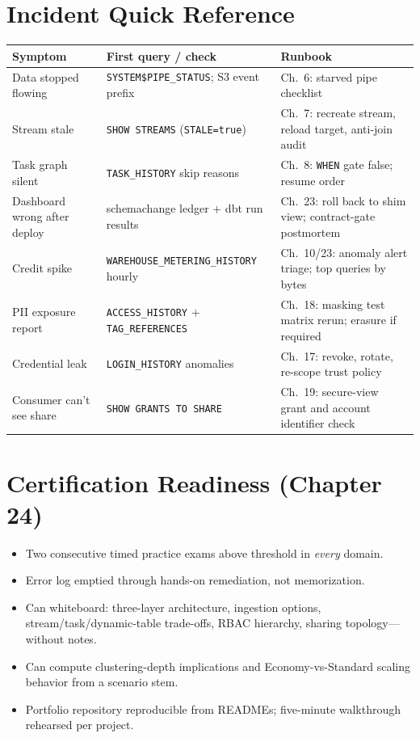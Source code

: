 \section{Incident Quick Reference}
\begin{center}
\footnotesize
\begin{tabular}{@{}p{4.4cm}p{4.8cm}p{4.8cm}@{}}
\toprule
\textbf{Symptom} & \textbf{First query / check} & \textbf{Runbook} \\
\midrule
Data stopped flowing & \texttt{SYSTEM\$PIPE\_STATUS}; S3 event prefix & Ch.~6: starved pipe checklist \\
Stream stale & \texttt{SHOW STREAMS} (\texttt{STALE=true}) & Ch.~7: recreate stream, reload target, anti-join audit \\
Task graph silent & \texttt{TASK\_HISTORY} skip reasons & Ch.~8: \texttt{WHEN} gate false; resume order \\
Dashboard wrong after deploy & schemachange ledger + dbt run results & Ch.~23: roll back to shim view; contract-gate postmortem \\
Credit spike & \texttt{WAREHOUSE\_METERING\_HISTORY} hourly & Ch.~10/23: anomaly alert triage; top queries by bytes \\
PII exposure report & \texttt{ACCESS\_HISTORY} + \texttt{TAG\_REFERENCES} & Ch.~18: masking test matrix rerun; erasure if required \\
Credential leak & \texttt{LOGIN\_HISTORY} anomalies & Ch.~17: revoke, rotate, re-scope trust policy \\
Consumer can't see share & \texttt{SHOW GRANTS TO SHARE} & Ch.~19: secure-view grant and account identifier check \\
\bottomrule
\end{tabular}
\end{center}

\section{Certification Readiness (Chapter 24)}
\begin{itemize}
    \item[$\square$] Two consecutive timed practice exams above threshold in \emph{every} domain.
    \item[$\square$] Error log emptied through hands-on remediation, not memorization.
    \item[$\square$] Can whiteboard: three-layer architecture, ingestion options, stream/task/dynamic-table trade-offs, RBAC hierarchy, sharing topology---without notes.
    \item[$\square$] Can compute clustering-depth implications and Economy-vs-Standard scaling behavior from a scenario stem.
    \item[$\square$] Portfolio repository reproducible from READMEs; five-minute walkthrough rehearsed per project.
\end{itemize}
